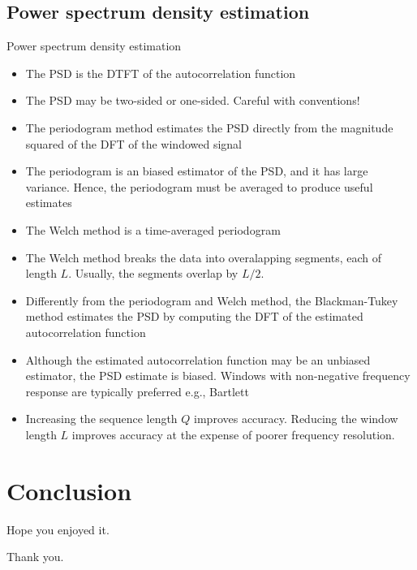 \documentclass[10pt, aspectratio=169]{beamer}
\begin{document}
\subsection{Power spectrum density estimation}
\begin{frame}{Power spectrum density estimation}
\begin{itemize}
	\item The PSD is the DTFT of the autocorrelation function
	\item The PSD may be two-sided or one-sided. Careful with conventions!
	\item The periodogram method estimates the PSD directly from the magnitude squared of the DFT of the windowed signal
	\item The periodogram is an biased estimator of the PSD, and it has large variance. Hence, the periodogram must be averaged to produce useful estimates
	\item The Welch method is a time-averaged periodogram
	\item The Welch method breaks the data into overalapping segments, each of length $L$. Usually, the segments overlap by $L/2$.
	\item Differently from the periodogram and Welch method, the Blackman-Tukey method estimates the PSD by computing the DFT of the estimated autocorrelation function
	\item Although the estimated autocorrelation function may be an unbiased estimator, the PSD estimate is biased. Windows with non-negative frequency response are typically preferred e.g., Bartlett
	\item Increasing the sequence length $Q$ improves accuracy. Reducing the window length $L$ improves accuracy at the expense of poorer frequency resolution.
\end{itemize}
\end{frame}

%
\section{Conclusion}
\begin{frame}

\begin{center}
	\Large Hope you enjoyed it.
\end{center}

\begin{flushright}
	\Large Thank you.
\end{flushright}

\end{frame}
\end{document}
